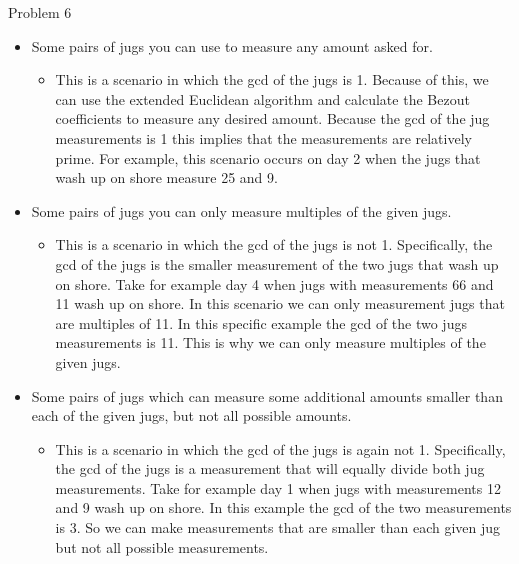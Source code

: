 \begin{problem}{Problem 6}
    \begin{Highlight}[Solution]
        \begin{itemize}
            \item Some pairs of jugs you can use to measure any amount asked for.
            \begin{itemize}
                \item This is a scenario in which the gcd of the jugs is 1. Because of this, we can use the extended Euclidean algorithm and calculate the Bezout coefficients to measure any desired
                amount. Because the gcd of the jug measurements is 1 this implies that the measurements are relatively prime. For example, this scenario occurs on day 2 when the jugs that wash up on
                shore measure 25 and 9.
            \end{itemize}
            \item Some pairs of jugs you can only measure multiples of the given jugs.
            \begin{itemize}
                \item This is a scenario in which the gcd of the jugs is not 1. Specifically, the gcd of the jugs is the smaller measurement of the two jugs that wash up on shore. Take for example
                day 4 when jugs with measurements 66 and 11 wash up on shore. In this scenario we can only measurement jugs that are multiples of 11. In this specific example the gcd of the two jugs
                measurements is 11. This is why we can only measure multiples of the given jugs.
            \end{itemize}
            \item Some pairs of jugs which can measure some additional amounts smaller than each of the given jugs, but not all possible amounts.
            \begin{itemize}
                \item This is a scenario in which the gcd of the jugs is again not 1. Specifically, the gcd of the jugs is a measurement that will equally divide both jug measurements. Take for example
                day 1 when jugs with measurements 12 and 9 wash up on shore. In this example the gcd of the two measurements is 3. So we can make measurements that are smaller than each given jug but
                not all possible measurements.
            \end{itemize}
        \end{itemize}
    \end{Highlight}
\end{problem}

